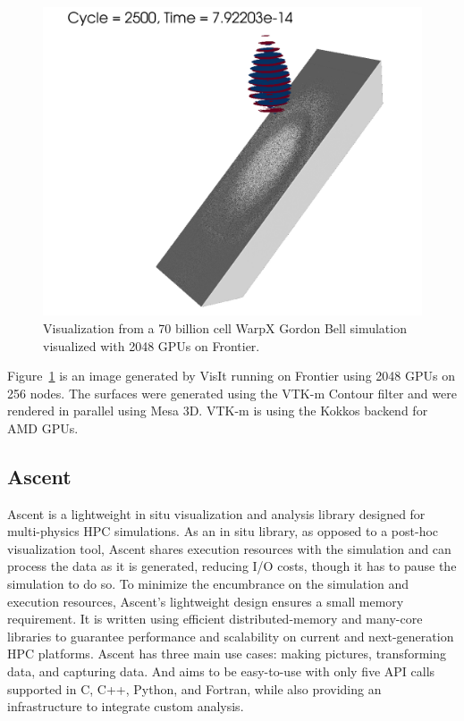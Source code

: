 \begin{figure}[htb]
  \includegraphics[width=\linewidth]{figures/visit_warpx_frontier.png}
  \caption{Visualization from a 70 billion cell WarpX Gordon Bell simulation visualized with 2048 GPUs on Frontier.}
  \label{fig:visit_warpx_frontier}
\end{figure}

Figure~\ref{fig:visit_warpx_frontier} is an image generated by VisIt running on Frontier using 2048 GPUs on 256 nodes. The surfaces were generated using the VTK-m Contour filter and were rendered in parallel using Mesa 3D. VTK-m is using the Kokkos backend for AMD GPUs.

\subsection{Ascent}
Ascent is a lightweight in situ visualization and analysis library designed for multi-physics HPC simulations. As an in situ library, as opposed to a post-hoc visualization tool, Ascent shares execution resources with the simulation and can process the data as it is generated, reducing I/O costs, though it has to pause the simulation to do so. To minimize the encumbrance on the simulation and execution resources, Ascent’s lightweight design ensures a small memory requirement. It is written using efficient distributed-memory and many-core libraries to guarantee performance and scalability on current and next-generation HPC platforms. Ascent has three main use cases: making pictures, transforming data, and capturing data. And aims to be easy-to-use with only five API calls supported in C, C++, Python, and Fortran, while also providing an infrastructure to integrate custom analysis.

